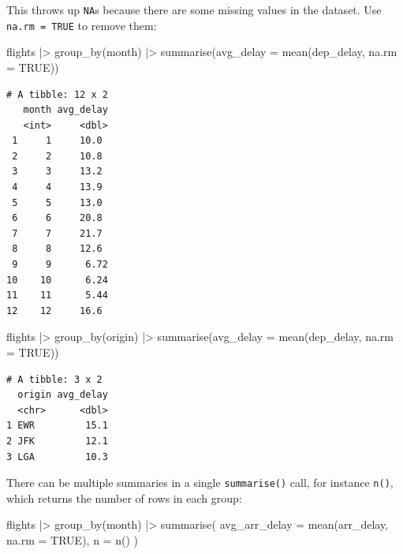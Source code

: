 \documentclass[
  letterpaper,
  DIV=11,
  numbers=noendperiod]{scrreprt}
\newenvironment{Shaded}{\begin{snugshade}}{\end{snugshade}}
\newcommand{\AttributeTok}[1]{\textcolor[rgb]{0.40,0.45,0.13}{#1}}
\newcommand{\ConstantTok}[1]{\textcolor[rgb]{0.56,0.35,0.01}{#1}}
\newcommand{\FunctionTok}[1]{\textcolor[rgb]{0.28,0.35,0.67}{#1}}
\newcommand{\NormalTok}[1]{\textcolor[rgb]{0.00,0.23,0.31}{#1}}
\newcommand{\SpecialCharTok}[1]{\textcolor[rgb]{0.37,0.37,0.37}{#1}}
\begin{document}
This throws up \texttt{NA}s because there are some missing values in the
dataset. Use \texttt{na.rm\ =\ TRUE} to remove them:

\begin{Shaded}
\begin{Highlighting}[]
\NormalTok{flights }\SpecialCharTok{|\textgreater{}}
  \FunctionTok{group\_by}\NormalTok{(month) }\SpecialCharTok{|\textgreater{}}
  \FunctionTok{summarise}\NormalTok{(}\AttributeTok{avg\_delay =} \FunctionTok{mean}\NormalTok{(dep\_delay, }\AttributeTok{na.rm =} \ConstantTok{TRUE}\NormalTok{))}
\end{Highlighting}
\end{Shaded}

\begin{verbatim}
# A tibble: 12 x 2
   month avg_delay
   <int>     <dbl>
 1     1     10.0 
 2     2     10.8 
 3     3     13.2 
 4     4     13.9 
 5     5     13.0 
 6     6     20.8 
 7     7     21.7 
 8     8     12.6 
 9     9      6.72
10    10      6.24
11    11      5.44
12    12     16.6 
\end{verbatim}

\begin{Shaded}
\begin{Highlighting}[]
\NormalTok{flights }\SpecialCharTok{|\textgreater{}}
  \FunctionTok{group\_by}\NormalTok{(origin) }\SpecialCharTok{|\textgreater{}}
  \FunctionTok{summarise}\NormalTok{(}\AttributeTok{avg\_delay =} \FunctionTok{mean}\NormalTok{(dep\_delay, }\AttributeTok{na.rm =} \ConstantTok{TRUE}\NormalTok{))}
\end{Highlighting}
\end{Shaded}

\begin{verbatim}
# A tibble: 3 x 2
  origin avg_delay
  <chr>      <dbl>
1 EWR         15.1
2 JFK         12.1
3 LGA         10.3
\end{verbatim}

There can be multiple summaries in a single \texttt{summarise()} call,
for instance \texttt{n()}, which returns the number of rows in each
group:

\begin{Shaded}
\begin{Highlighting}[]
\NormalTok{flights }\SpecialCharTok{|\textgreater{}}
  \FunctionTok{group\_by}\NormalTok{(month) }\SpecialCharTok{|\textgreater{}}
  \FunctionTok{summarise}\NormalTok{(}
    \AttributeTok{avg\_arr\_delay =} \FunctionTok{mean}\NormalTok{(arr\_delay, }\AttributeTok{na.rm =} \ConstantTok{TRUE}\NormalTok{),}
    \AttributeTok{n =} \FunctionTok{n}\NormalTok{()}
\NormalTok{  )}
\end{Highlighting}
\end{Shaded}
\end{document}
